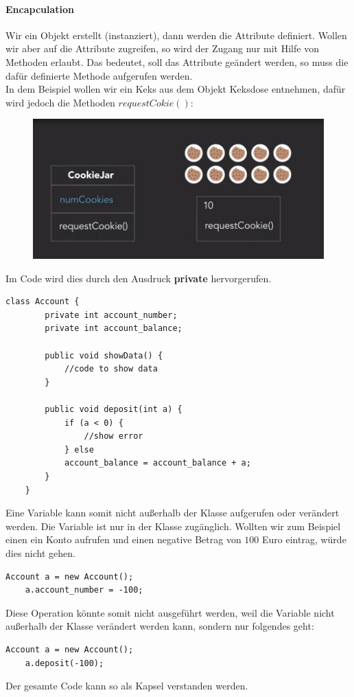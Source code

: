 \paragraph{Encapculation}
Wir ein Objekt erstellt (instanziert), dann werden die Attribute definiert. Wollen wir aber auf die Attribute zugreifen, so wird der Zugang nur mit Hilfe von Methoden erlaubt. Das bedeutet, soll das Attribute geändert werden, so muss die dafür definierte Methode aufgerufen werden. \\

In dem Beispiel wollen wir ein Keks aus dem Objekt Keksdose entnehmen, dafür wird jedoch die Methoden $requestCokie()$:
\begin{figure}[H]
	\centering
	\includegraphics[scale = 0.3]{attachment/chapter_2/Scc008}
	\caption{}
	\label{fig:Scc008}
\end{figure}
Im Code wird dies durch den Ausdruck \textbf{private} hervorgerufen.  
\begin{lstlisting}[style=C++]
	class Account {
		private int account_number;
		private int account_balance;
		
		public void showData() {
			//code to show data 
		}
		
		public void deposit(int a) {
			if (a < 0) {
				//show error 
			} else
			account_balance = account_balance + a;
		}
	}
\end{lstlisting}
Eine Variable kann somit nicht außerhalb der Klasse aufgerufen oder verändert werden. Die Variable ist nur in der Klasse zugänglich. Wollten wir zum Beispiel einen ein Konto aufrufen und einen negative Betrag von $100$ Euro eintrag, würde dies nicht gehen.
\begin{lstlisting}[style=C++]
	Account a = new Account();
	a.account_number = -100;
\end{lstlisting}
Diese Operation könnte somit nicht ausgeführt werden, weil die Variable nicht außerhalb der Klasse verändert werden kann, sondern nur folgendes geht:
\begin{lstlisting}[style=C++]
	Account a = new Account();
	a.deposit(-100);
\end{lstlisting}
Der gesamte Code kann so als Kapsel verstanden werden.
